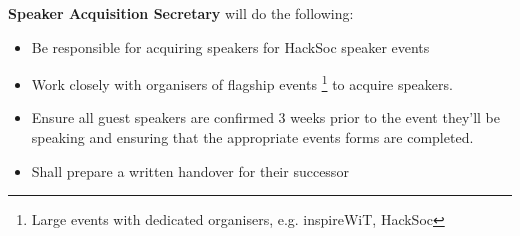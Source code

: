 \item \textbf{Speaker Acquisition Secretary} will do the following:
\begin{itemize}
	\item Be responsible for acquiring speakers for HackSoc speaker events
	\item Work closely with organisers of flagship events \footnote{Large events with dedicated organisers, e.g. inspireWiT, HackSoc} to acquire speakers.
	\item Ensure all guest speakers are confirmed 3 weeks prior to the event they'll be speaking and ensuring that the appropriate events forms are completed.
	\item Shall prepare a written handover for their successor
\end{itemize}